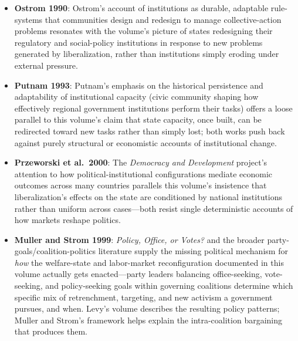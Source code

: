 \documentclass[12pt]{article}
\begin{document}
\begin{itemize}[leftmargin=*, itemsep=4pt]
    \item \textbf{Ostrom 1990}: Ostrom's account of institutions as durable, adaptable rule-systems that communities design and redesign to manage collective-action problems resonates with the volume's picture of states redesigning their regulatory and social-policy institutions in response to new problems generated by liberalization, rather than institutions simply eroding under external pressure.
    \item \textbf{Putnam 1993}: Putnam's emphasis on the historical persistence and adaptability of institutional capacity (civic community shaping how effectively regional government institutions perform their tasks) offers a loose parallel to this volume's claim that state capacity, once built, can be redirected toward new tasks rather than simply lost; both works push back against purely structural or economistic accounts of institutional change.
    \item \textbf{Przeworski et al.\ 2000}: The \textit{Democracy and Development} project's attention to how political-institutional configurations mediate economic outcomes across many countries parallels this volume's insistence that liberalization's effects on the state are conditioned by national institutions rather than uniform across cases---both resist single deterministic accounts of how markets reshape politics.
    \item \textbf{Muller and Strom 1999}: \textit{Policy, Office, or Votes?} and the broader party-goals/coalition-politics literature supply the missing political mechanism for \emph{how} the welfare-state and labor-market reconfiguration documented in this volume actually gets enacted---party leaders balancing office-seeking, vote-seeking, and policy-seeking goals within governing coalitions determine which specific mix of retrenchment, targeting, and new activism a government pursues, and when. Levy's volume describes the resulting policy patterns; Muller and Strom's framework helps explain the intra-coalition bargaining that produces them.
\end{itemize}
\end{document}
